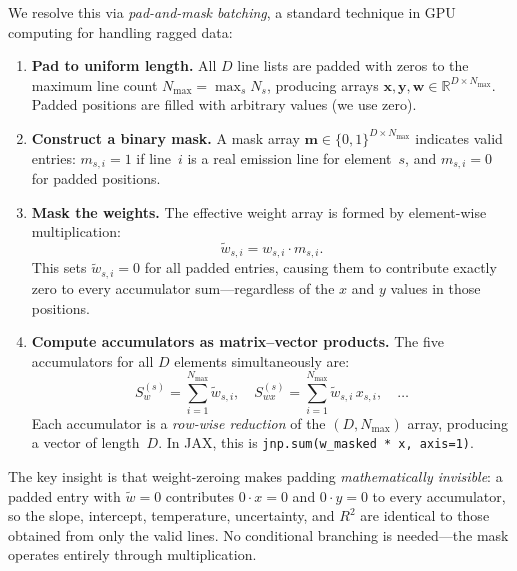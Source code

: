 We resolve this via \emph{pad-and-mask batching}, a standard technique in GPU computing for handling ragged data:
\begin{enumerate}
  \item \textbf{Pad to uniform length.} All $D$ line lists are padded with zeros to the maximum line count $N_\mathrm{max} = \max_s N_s$, producing arrays $\bm{x}, \bm{y}, \bm{w} \in \mathbb{R}^{D \times N_\mathrm{max}}$.
  Padded positions are filled with arbitrary values (we use zero).

  \item \textbf{Construct a binary mask.}
  A mask array $\bm{m} \in \{0, 1\}^{D \times N_\mathrm{max}}$ indicates valid entries: $m_{s,i} = 1$ if line~$i$ is a real emission line for element~$s$, and $m_{s,i} = 0$ for padded positions.

  \item \textbf{Mask the weights.}
  The effective weight array is formed by element-wise multiplication:
  \begin{equation}
    \tilde{w}_{s,i} = w_{s,i} \cdot m_{s,i}.
    \label{eq:masked-weights}
  \end{equation}
  This sets $\tilde{w}_{s,i} = 0$ for all padded entries, causing them to contribute exactly zero to every accumulator sum---regardless of the $x$ and $y$ values in those positions.

  \item \textbf{Compute accumulators as matrix--vector products.}
  The five accumulators for all $D$ elements simultaneously are:
  \begin{equation}
    S_w^{(s)} = \sum_{i=1}^{N_\mathrm{max}} \tilde{w}_{s,i}, \quad
    S_{wx}^{(s)} = \sum_{i=1}^{N_\mathrm{max}} \tilde{w}_{s,i}\, x_{s,i}, \quad \ldots
    \label{eq:batched-accumulators}
  \end{equation}
  Each accumulator is a \emph{row-wise reduction} of the $(D, N_\mathrm{max})$ array, producing a vector of length~$D$.
  In JAX, this is \texttt{jnp.sum(w\_masked * x, axis=1)}.
\end{enumerate}

\noindent
The key insight is that weight-zeroing makes padding \emph{mathematically invisible}: a padded entry with $\tilde{w} = 0$ contributes $0 \cdot x = 0$ and $0 \cdot y = 0$ to every accumulator, so the slope, intercept, temperature, uncertainty, and $R^2$ are identical to those obtained from only the valid lines.
No conditional branching is needed---the mask operates entirely through multiplication.


